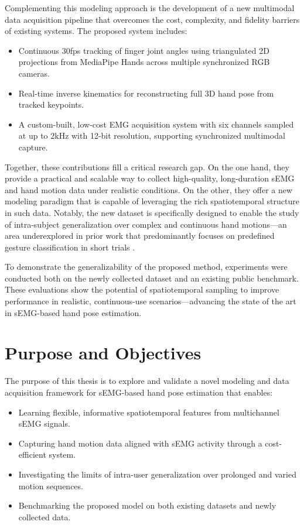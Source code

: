 Complementing this modeling approach is the development of a new multimodal data acquisition pipeline that overcomes the cost, complexity, and fidelity barriers of existing systems. The proposed system includes:
\begin{itemize}
    \item Continuous 30fps tracking of finger joint angles using triangulated 2D projections from MediaPipe Hands across multiple synchronized RGB cameras.
    \item Real-time inverse kinematics for reconstructing full 3D hand pose from tracked keypoints.
    \item A custom-built, low-cost EMG acquisition system with six channels sampled at up to 2kHz with 12-bit resolution, supporting synchronized multimodal capture.
\end{itemize}

Together, these contributions fill a critical research gap. On the one hand, they provide a practical and scalable way to collect high-quality, long-duration sEMG and hand motion data under realistic conditions. On the other, they offer a new modeling paradigm that is capable of leveraging the rich spatiotemporal structure in such data. Notably, the new dataset is specifically designed to enable the study of intra-subject generalization over complex and continuous hand motions—an area underexplored in prior work that predominantly focuses on predefined gesture classification in short trials \cite{salter2024emg2pose}.

To demonstrate the generalizability of the proposed method, experiments were conducted both on the newly collected dataset and an existing public benchmark. These evaluations show the potential of spatiotemporal sampling to improve performance in realistic, continuous-use scenarios—advancing the state of the art in sEMG-based hand pose estimation.

\section{Purpose and Objectives}

The purpose of this thesis is to explore and validate a novel modeling and data acquisition framework for sEMG-based hand pose estimation that enables:
\begin{itemize}
    \item Learning flexible, informative spatiotemporal features from multichannel sEMG signals.
    \item Capturing hand motion data aligned with sEMG activity through a cost-efficient system.
    \item Investigating the limits of intra-user generalization over prolonged and varied motion sequences.
    \item Benchmarking the proposed model on both existing datasets and newly collected data.
\end{itemize}

